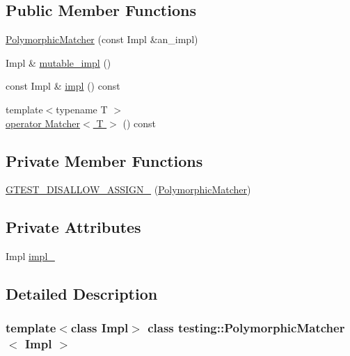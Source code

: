 \subsection*{Public Member Functions}
\begin{DoxyCompactItemize}
\item 
\hyperlink{classtesting_1_1PolymorphicMatcher_a04c23972b2dcc6e036b00006d7689712}{Polymorphic\+Matcher} (const Impl \&an\+\_\+impl)
\item 
Impl \& \hyperlink{classtesting_1_1PolymorphicMatcher_a3b7227b1f5c203efd47d393b781b317c}{mutable\+\_\+impl} ()
\item 
const Impl \& \hyperlink{classtesting_1_1PolymorphicMatcher_ab10e4858d8dc903d3e1e378d53d25882}{impl} () const
\item 
{\footnotesize template$<$typename T $>$ }\\\hyperlink{classtesting_1_1PolymorphicMatcher_a6280c1485ca41a48c858c38828c1e04e}{operator Matcher$<$ T $>$} () const
\end{DoxyCompactItemize}
\subsection*{Private Member Functions}
\begin{DoxyCompactItemize}
\item 
\hyperlink{classtesting_1_1PolymorphicMatcher_a008970faa86ba4970cf4633ecfe8e46c}{G\+T\+E\+S\+T\+\_\+\+D\+I\+S\+A\+L\+L\+O\+W\+\_\+\+A\+S\+S\+I\+G\+N\+\_\+} (\hyperlink{classtesting_1_1PolymorphicMatcher}{Polymorphic\+Matcher})
\end{DoxyCompactItemize}
\subsection*{Private Attributes}
\begin{DoxyCompactItemize}
\item 
Impl \hyperlink{classtesting_1_1PolymorphicMatcher_adadea4f2c7b639586ed2f21b27303382}{impl\+\_\+}
\end{DoxyCompactItemize}


\subsection{Detailed Description}
\subsubsection*{template$<$class Impl$>$\newline
class testing\+::\+Polymorphic\+Matcher$<$ Impl $>$}




